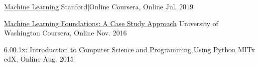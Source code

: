 

\begin{cvhonors}

  \cvhonor
    {\href{https://www.coursera.org/account/accomplishments/certificate/B59YS9227J9Y}{Machine Learning}} %
    {Stanford|Online} %
    {Coursera, Online} %
    {Jul. 2019} %

  \cvhonor
    {\href{https://www.coursera.org/account/accomplishments/certificate/2E5SAMFE7Q6Z}{Machine Learning Foundations: A Case Study Approach}} %
    {University of Washington} %
    {Coursera, Online} %
    {Nov. 2016} %

  \cvhonor
    {\href{https://s3.amazonaws.com/verify.edx.org/downloads/5d3f0ad16aa747789aa8802f9b012541/Certificate.pdf}{6.00.1x: Introduction to Computer Science and Programming Using Python}} %
    {MITx} %
    {edX, Online} %
    {Aug. 2015} %

\end{cvhonors}

